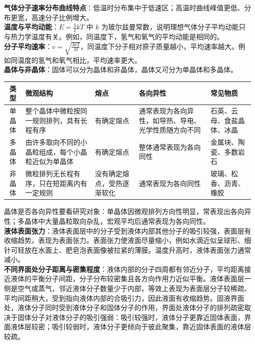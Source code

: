 \begin{keypointbox}[title={\strut\textcolor{white}{\bfseries 重点知识点：速率分布与内能}}]
\textbf{气体分子速率分布曲线特点}：低温时分布集中于低速区；高温时曲线峰值更低、分布更宽，高速分子比例增大。\\

\textbf{温度与平均动能}：$E=\frac{3}{2}kT$ 中 $k$ 为玻尔兹曼常数，说明理想气体分子平均动能只与热力学温度有关。例如，同温度下，氢气和氧气的平均动能是相同的。\\

\textbf{分子平均速率}：$v=\sqrt{\frac{3kT}{M}}$，同温度下分子相对原子质量越小，平均速率越大。例如同温度的氢气和氧气相比，平均速率更大。\\

\textbf{晶体与非晶体}：固体可以分为晶体和非晶体，晶体又可分为单晶体和多晶体。
\begin{center}
\begin{tabularx}{\columnwidth}{|c|X|X|X|X|}
  \hline
  类型 & 微观结构 & 熔点 & 各向异性 & 常见物质 \\
  \hline
  单晶体 & 整个晶体中微粒按同一规则排列，具有长程有序 & 有确定熔点 & 通常表现为各向异性，如导热、导电、光学性质随方向不同 & 石英、云母、食盐晶体、冰晶 \\
  \hline
  多晶体 & 由许多取向不同的小晶粒组成，每个小晶粒近似为单晶体 & 有确定熔点 & 整体通常表现为各向同性 & 金属块、陶瓷、多数岩石 \\
  \hline
  非晶体 & 微粒排列无长程有序，只在短距离内有一定规则 & 没有确定熔点，受热逐渐软化 & 通常表现为各向同性 & 玻璃、松香、沥青、橡胶 \\
  \hline
\end{tabularx}
\end{center}
晶体是否各向异性要看研究对象：单晶体因微观排列方向性明显，常表现出各向异性；多晶体中大量晶粒取向杂乱，宏观平均后通常表现为各向同性。\\

\textbf{液体表面张力}：液体表面层中的分子受到液体内部其他分子的吸引较强，表面层有收缩趋势，表现为表面张力。表面张力使液面尽量缩小，例如水滴近似呈球形、细针可轻放在水面上、肥皂泡表面像被拉紧的薄膜。温度升高时，液体表面张力通常减小。\\

\textbf{不同界面处分子距离与密集程度}：液体内部的分子四周都有邻近分子，平均距离接近液体的平衡分子间距，分子分布较密集且各方向作用力近似平衡。液体表面层一侧是空气或蒸气，邻近液体分子数量少于内部，等效上表现为表面层分子较稀疏、平均间距稍大，受到指向液体内部的合吸引力，因此液面有收缩趋势。固液界面处，液体分子同时受到液体分子和固体分子的作用，界面处液体分子的排列疏密取决于固体分子对液体分子的吸引强弱：吸引较强时，液体分子更靠近固体表面，界面液体层较密；吸引较弱时，液体分子更倾向于彼此聚集，靠近固体表面的液体层较疏。\\


\end{keypointbox}
